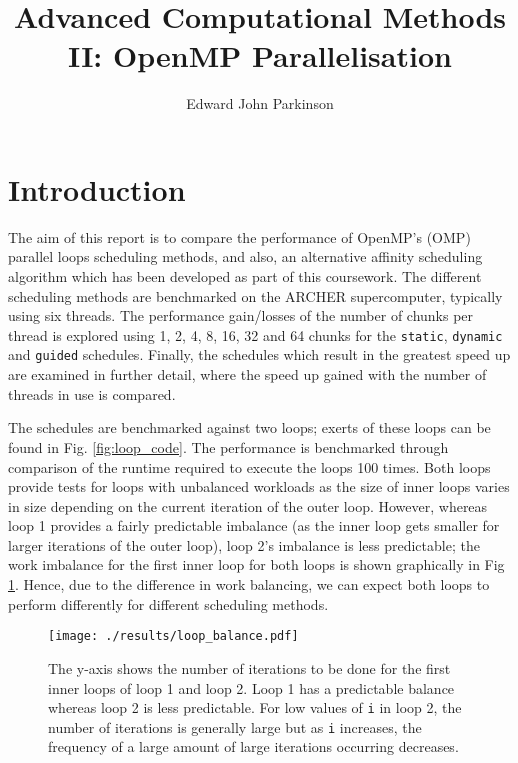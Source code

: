 \documentclass[11pt, a4paper]{article}
\begin{document}
	\title{Advanced Computational Methods II: OpenMP Parallelisation}
	\author{Edward John Parkinson}
	\maketitle	
	
	\section{Introduction}
		The aim of this report is to compare the performance of OpenMP's (OMP) parallel loops scheduling methods, and also, an alternative affinity scheduling algorithm which has been developed as part of this coursework. The different scheduling methods are benchmarked on the ARCHER supercomputer, typically using six threads. The performance gain/losses of the number of chunks per thread is explored using 1, 2, 4, 8, 16, 32 and 64 chunks for the \texttt{static}, \texttt{dynamic} and \texttt{guided} schedules. Finally, the schedules which result in the greatest speed up are examined in further detail, where the speed up gained with the number of threads in use is compared.
		
		The schedules are benchmarked against two loops; exerts of these loops can be found in Fig. \ref{fig:loop_code}. The performance is benchmarked through comparison of the runtime required to execute the loops 100 times. Both loops provide tests for loops with unbalanced workloads as the size of inner loops varies in size depending on the current iteration of the outer loop. However, whereas loop 1 provides a fairly predictable imbalance (as the inner loop gets smaller for larger iterations of the outer loop), loop 2's imbalance is less predictable; the work imbalance for the first inner loop for both loops is shown graphically in Fig \ref{fig:loop_balance}. Hence, due to the difference in work balancing, we can expect both loops to perform differently for different scheduling methods.

		\begin{figure}
			\centering
			\texttt{[image: ./results/loop\_balance.pdf]}
			\caption{The y-axis shows the number of iterations to be done for the first inner loops of loop 1 and loop 2. Loop 1 has a predictable balance whereas loop 2 is less predictable. For low values of \texttt{i} in loop 2, the number of iterations is generally large but as \texttt{i} increases, the frequency of a large amount of large iterations occurring decreases.}
			\label{fig:loop_balance}
		\end{figure}
\end{document}
